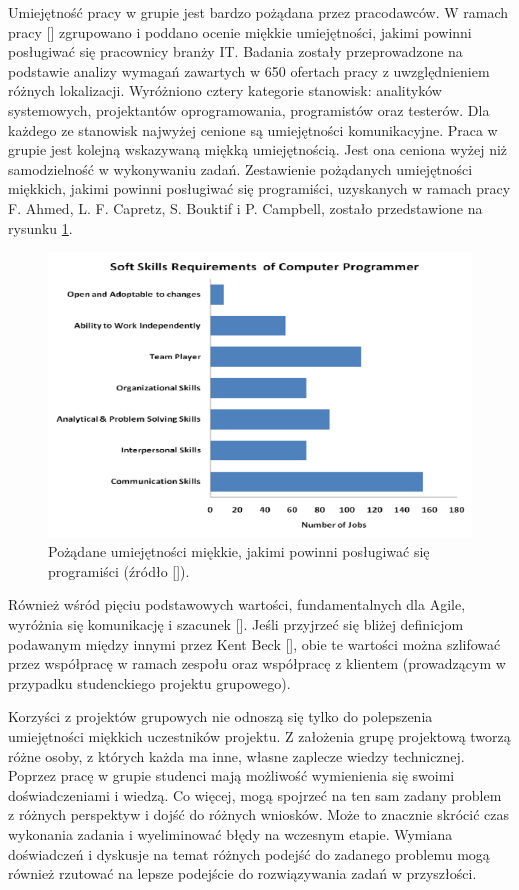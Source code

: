 Umiejętność pracy w grupie jest bardzo pożądana przez pracodawców.
W ramach pracy [] zgrupowano i poddano ocenie miękkie umiejętności, jakimi powinni posługiwać się pracownicy branży IT.
Badania zostały przeprowadzone na podstawie analizy wymagań zawartych w 650 ofertach pracy z uwzględnieniem różnych lokalizacji.
Wyróżniono cztery kategorie stanowisk: analityków systemowych, projektantów oprogramowania, programistów oraz testerów.
Dla każdego ze stanowisk najwyżej cenione są umiejętności komunikacyjne.
Praca w grupie jest kolejną wskazywaną miękką umiejętnością.
Jest ona ceniona wyżej niż samodzielność w wykonywaniu zadań.
Zestawienie pożądanych umiejętności miękkich, jakimi powinni posługiwać się programiści, uzyskanych w ramach pracy F. Ahmed, L. F. Capretz, S. Bouktif i P. Campbell, zostało przedstawione na rysunku \ref{fig:soft-skills}.

\begin{figure}[h]
    \centering
    \includegraphics[width = 13cm]{chapter01/soft-skills.png}
    \caption{Pożądane umiejętności miękkie, jakimi powinni posługiwać się programiści (źródło []).}
    \label{fig:soft-skills}
\end{figure}

Również wśród pięciu podstawowych wartości, fundamentalnych dla Agile, wyróżnia się komunikację i szacunek [].
Jeśli przyjrzeć się bliżej definicjom podawanym między innymi przez Kent Beck [], obie te wartości można szlifować przez współpracę w ramach zespołu oraz współpracę z klientem (prowadzącym w przypadku studenckiego projektu grupowego).

Korzyści z projektów grupowych nie odnoszą się tylko do polepszenia umiejętności miękkich uczestników projektu.
Z założenia grupę projektową tworzą różne osoby, z których każda ma inne, własne zaplecze wiedzy technicznej.
Poprzez pracę w grupie studenci mają możliwość wymienienia się swoimi doświadczeniami i wiedzą.
Co więcej, mogą spojrzeć na ten sam zadany problem z różnych perspektyw i dojść do różnych wniosków.
Może to znacznie skrócić czas wykonania zadania i wyeliminować błędy na wczesnym etapie. 
Wymiana doświadczeń i dyskusje na temat różnych podejść do zadanego problemu mogą również rzutować na lepsze podejście do rozwiązywania zadań w przyszłości.

